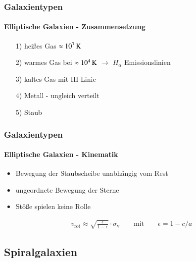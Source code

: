 \begin{frame}
\frametitle{Galaxientypen}
\framesubtitle{Elliptische Galaxien - Zusammensetzung}

\begin{itemize}
\item[1)] heißes Gas $\approx \unit[10^7]{K}$ \\
\item[2)] warmes Gas bei $\approx \unit[10^4]{K}$ $\rightarrow$ $H_\alpha$ Emissionslinien
\item[3)] kaltes Gas mit HI-Linie
\item[4)] Metall - ungleich verteilt
\item[5)] Staub 
\end{itemize}

\end{frame}


\begin{frame}
\frametitle{Galaxientypen}
\framesubtitle{Elliptische Galaxien - Kinematik}

\begin{itemize}
\item Bewegung der Staubscheibe unabhängig vom Rest
\item ungeordnete Bewegung der Sterne
\item Stöße spielen keine Rolle
\end{itemize}


\begin{align*}
&v_{\text{rot}} \approx \sqrt{\frac{\epsilon}{1 - \epsilon}} \cdot \sigma_{\text{v}} \qquad \text{mit} \qquad \epsilon = 1 - c/a
\end{align*}

\end{frame}


\subsection{Spiralgalaxien}

